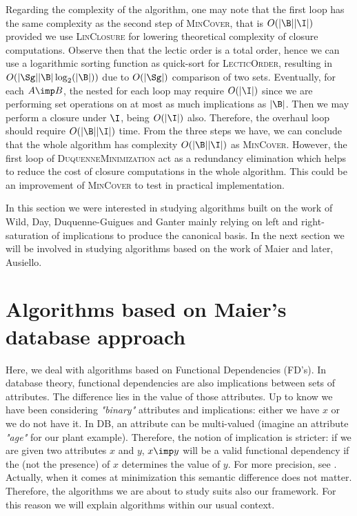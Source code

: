 Regarding the complexity of the algorithm, one may note that the first loop has
the same complexity as the second step of \textsc{MinCover}, that is $O(|\B||\I|)$ provided we use \textsc{LinClosure} for lowering theoretical complexity of closure computations. Observe then that the lectic order is a total order, hence we can use a logarithmic sorting function as quick-sort for
\textsc{LecticOrder}, resulting in $O(|\Sg||\B|\log_2(|\B|))$ due to $O(|\Sg|)$
comparison of two sets. Eventually, for each $A \imp B$, the nested for each loop may require $O(|\I|)$ since we are performing set operations on at most as much implications as $|\B|$. Then we may perform a closure under $\I$, being
$O(|\I|)$ also. Therefore, the overhaul loop should require $O(|\B||\I|)$ time.
From the three steps we have, we can conclude that the whole algorithm has complexity $O(|\B||\I|)$ as \textsc{MinCover}. However, the first loop of 
\textsc{DuquenneMinimization} act as a redundancy elimination which helps to
reduce the cost of closure computations in the whole algorithm. This could be
an improvement of \textsc{MinCover} to test in practical implementation.

\vspace{1.2em}

In this section we were interested in studying algorithms built on the work of
Wild, Day, Duquenne-Guigues and Ganter mainly relying on left and right-saturation of implications to produce the canonical basis. In the next section we will be involved in studying algorithms based on the work of Maier
and later, Ausiello.




\section{Algorithms based on Maier's database approach}

Here, we deal with algorithms based on Functional Dependencies (FD's). In database theory, functional dependencies are also implications between sets
of attributes. The difference lies in the value of those attributes. Up to know we have been considering \textit{"binary"} attributes and implications: either
we have $x$ or we do not have it. In DB, an attribute can be multi-valued (imagine an attribute \textit{"age"} for our plant example). Therefore, the 
notion of implication is stricter: if we are given two attributes $x$ and $y$,
$x \imp y$ will be a valid functional dependency if the  (not the presence) of $x$ determines the value of $y$. For more precision, see \cite{maier_theory_1983}. Actually, when it comes at minimization this semantic difference does not matter. Therefore, the algorithms we are about to study suits also our framework. For this reason we will explain algorithms within our
usual context.


